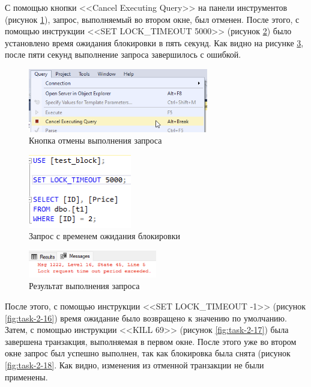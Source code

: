\documentclass[a4paper, 14pt]{extarticle}
\begin{document}
С помощью кнопки <<\foreignlanguage{english}{Cancel Executing Query}>> на панели
инструментов (рисунок \ref{fig:task-2-13}), запрос, выполняемый во втором окне,
был отменен. После этого, с помощью инструкции <<\foreignlanguage{english}{SET
  LOCK\_TIMEOUT 5000}>> (рисунок \ref{fig:task-2-14}) было установлено время
ожидания блокировки в пять секунд. Как видно на рисунке \ref{fig:task-2-15},
после пяти секунд выполнение запроса завершилось с ошибкой.

\begin{figure}[H]
  \centering
  \includegraphics[width=0.7\textwidth]{images/task-2/13.png}
  \caption{Кнопка отмены выполнения запроса}
  \label{fig:task-2-13}
\end{figure}

\begin{figure}[H]
  \centering
  \includegraphics[width=0.4\textwidth]{images/task-2/14.png}
  \caption{Запрос с временем ожидания блокировки}
  \label{fig:task-2-14}
\end{figure}

\begin{figure}[H]
  \centering
  \includegraphics[width=0.5\textwidth]{images/task-2/15.png}
  \caption{Результат выполнения запроса}
  \label{fig:task-2-15}
\end{figure}

После этого, с помощью инструкции <<\foreignlanguage{english}{SET
  LOCK\_TIMEOUT -1}>> (рисунок \ref{fig:task-2-16}) время ожидание было возвращено
к значению по умолчанию. Затем, с помощью инструкции
<<\foreignlanguage{english}{KILL 69}>> (рисунок \ref{fig:task-2-17}) была
завершена транзакция, выполняемая в первом окне. После этого уже во втором окне
запрос был успешно выполнен, так как блокировка была снята (рисунок
\ref{fig:task-2-18}. Как видно, изменения из отменной транзакции не были
применены.
\end{document}
